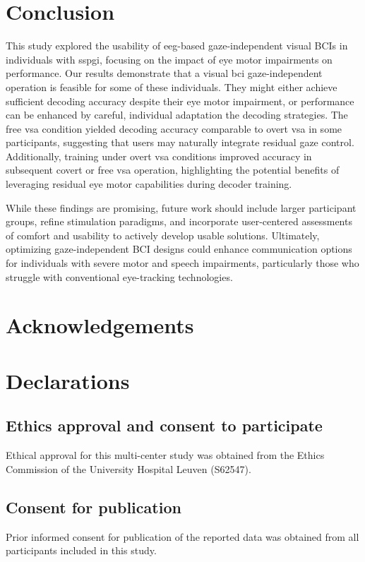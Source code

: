 \documentclass{article}
\begin{document}
\section{Conclusion}
This study explored the usability of \ac{eeg}-based gaze-independent visual BCIs in
individuals with \ac{sspgi}, focusing on the impact of eye motor impairments
on performance.
Our results demonstrate that a visual \ac{bci} gaze-independent operation is feasible
for some of these individuals.
They might either achieve sufficient decoding accuracy despite their eye
motor impairment, or performance can be enhanced by careful, individual
adaptation the decoding strategies.
The free \ac{vsa} condition yielded decoding accuracy comparable to overt \ac{vsa} in some participants, suggesting that users may naturally integrate residual gaze control.
Additionally, training under overt \ac{vsa} conditions improved accuracy in
subsequent covert or free \ac{vsa} operation, highlighting the potential benefits of
leveraging residual eye motor capabilities during decoder training.

While these findings are promising, future work should include larger
participant groups, refine stimulation paradigms, and incorporate
user-centered assessments of comfort and usability to actively develop usable
solutions.
Ultimately, optimizing gaze-independent BCI designs could enhance communication
options for individuals with severe motor and speech impairments, particularly
those who struggle with conventional eye-tracking technologies.


\section*{Acknowledgements}

\printacronyms

\section*{Declarations}
\subsection*{Ethics approval and consent to participate}
Ethical approval for this multi-center study was obtained from the Ethics
Commission of the University Hospital Leuven (S62547).

\subsection*{Consent for publication}
Prior informed consent for publication of the reported data was obtained from
all participants included in this study.
\end{document}

